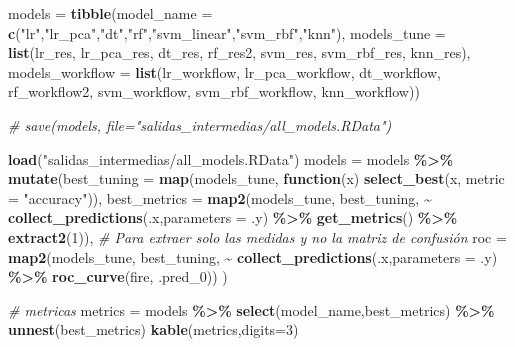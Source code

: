\documentclass[12pt,a4paper,]{book}
\newenvironment{Shaded}{\begin{snugshade}}{\end{snugshade}}
\newcommand{\AttributeTok}[1]{\textcolor[rgb]{0.13,0.29,0.53}{#1}}
\newcommand{\CommentTok}[1]{\textcolor[rgb]{0.56,0.35,0.01}{\textit{#1}}}
\newcommand{\ControlFlowTok}[1]{\textcolor[rgb]{0.13,0.29,0.53}{\textbf{#1}}}
\newcommand{\DecValTok}[1]{\textcolor[rgb]{0.00,0.00,0.81}{#1}}
\newcommand{\FunctionTok}[1]{\textcolor[rgb]{0.13,0.29,0.53}{\textbf{#1}}}
\newcommand{\NormalTok}[1]{#1}
\newcommand{\OtherTok}[1]{\textcolor[rgb]{0.56,0.35,0.01}{#1}}
\newcommand{\SpecialCharTok}[1]{\textcolor[rgb]{0.81,0.36,0.00}{\textbf{#1}}}
\newcommand{\StringTok}[1]{\textcolor[rgb]{0.31,0.60,0.02}{#1}}
\numberwithin{dummy}{section}
\theoremstyle{ocrenumbox}
\theoremstyle{blacknumex}
\theoremstyle{blacknumbox}
\theoremstyle{ocrenum}
\theoremstyle{ocrenum}
\begin{document}
\begin{Shaded}
\begin{Highlighting}[]
\NormalTok{models }\OtherTok{=} \FunctionTok{tibble}\NormalTok{(}\AttributeTok{model\_name =} \FunctionTok{c}\NormalTok{(}\StringTok{"lr"}\NormalTok{,}\StringTok{"lr\_pca"}\NormalTok{,}\StringTok{"dt"}\NormalTok{,}\StringTok{"rf"}\NormalTok{,}\StringTok{"svm\_linear"}\NormalTok{,}\StringTok{"svm\_rbf"}\NormalTok{,}\StringTok{"knn"}\NormalTok{),}
                \AttributeTok{models\_tune =} \FunctionTok{list}\NormalTok{(lr\_res, lr\_pca\_res, dt\_res, rf\_res2, svm\_res, svm\_rbf\_res, knn\_res),}
                \AttributeTok{models\_workflow =} \FunctionTok{list}\NormalTok{(lr\_workflow, lr\_pca\_workflow, dt\_workflow, rf\_workflow2, svm\_workflow, svm\_rbf\_workflow, knn\_workflow))}

\CommentTok{\# save(models, file="salidas\_intermedias/all\_models.RData")}

\FunctionTok{load}\NormalTok{(}\StringTok{"salidas\_intermedias/all\_models.RData"}\NormalTok{)}
\NormalTok{models }\OtherTok{=}\NormalTok{ models }\SpecialCharTok{\%\textgreater{}\%} 
  \FunctionTok{mutate}\NormalTok{(}\AttributeTok{best\_tuning =} \FunctionTok{map}\NormalTok{(models\_tune,}
                           \ControlFlowTok{function}\NormalTok{(x) }\FunctionTok{select\_best}\NormalTok{(x, }\AttributeTok{metric =} \StringTok{"accuracy"}\NormalTok{)),}
         \AttributeTok{best\_metrics =} \FunctionTok{map2}\NormalTok{(models\_tune,}
\NormalTok{                             best\_tuning,                                               }\SpecialCharTok{\textasciitilde{}} \FunctionTok{collect\_predictions}\NormalTok{(.x,}\AttributeTok{parameters =}\NormalTok{ .y) }\SpecialCharTok{\%\textgreater{}\%}                                                  \FunctionTok{get\_metrics}\NormalTok{() }\SpecialCharTok{\%\textgreater{}\%}                                                  \FunctionTok{extract2}\NormalTok{(}\DecValTok{1}\NormalTok{)), }\CommentTok{\# Para extraer solo las medidas y no la matriz de confusión}
         \AttributeTok{roc =} \FunctionTok{map2}\NormalTok{(models\_tune,}
\NormalTok{                    best\_tuning,}
                    \SpecialCharTok{\textasciitilde{}} \FunctionTok{collect\_predictions}\NormalTok{(.x,}\AttributeTok{parameters =}\NormalTok{ .y) }\SpecialCharTok{\%\textgreater{}\%}                                         \FunctionTok{roc\_curve}\NormalTok{(fire, .pred\_0))}
\NormalTok{) }

\CommentTok{\# metricas}
\NormalTok{metrics }\OtherTok{=}\NormalTok{ models }\SpecialCharTok{\%\textgreater{}\%} 
  \FunctionTok{select}\NormalTok{(model\_name,best\_metrics) }\SpecialCharTok{\%\textgreater{}\%} 
  \FunctionTok{unnest}\NormalTok{(best\_metrics)}
\FunctionTok{kable}\NormalTok{(metrics,}\AttributeTok{digits=}\DecValTok{3}\NormalTok{) }


\end{Highlighting}
\end{Shaded}
\end{document}
